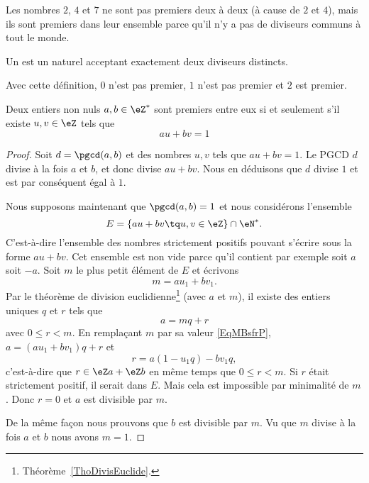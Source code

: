 Les nombres \( 2\), \( 4\) et \( 7\) ne sont pas premiers deux à deux (à cause de \( 2\) et \( 4\)), mais ils sont premiers dans leur ensemble parce qu'il n'y a pas de diviseurs communs à tout le monde.

\begin{definition}
    Un  est un naturel acceptant exactement deux diviseurs distincts.
\end{definition}
Avec cette définition, \( 0\) n'est pas premier, \( 1\) n'est pas premier et \( 2\) est premier.

\begin{theorem} \label{ThoBuNjam}
    Deux entiers non nuls \( a,b\in\eZ^*\) sont premiers entre eux si et seulement s'il existe \( u,v\in\eZ\) tels que
    \begin{equation}
        au+bv=1
    \end{equation}
\end{theorem}

\begin{proof}
    Soit \( d=\pgcd(a,b)\) et des nombres \( u,v\) tels que \( au+bv=1\). Le PGCD \( d\) divise à la fois \( a\) et \( b\), et donc divise \( au+bv\). Nous en déduisons que \( d\) divise \( 1\) et est par conséquent égal à \( 1\).

    Nous supposons maintenant que \( \pgcd(a,b)=1\) et nous considérons l'ensemble
    \begin{equation}
        E=\{ au+bv\tq u,v\in \eZ \}\cap \eN^*.
    \end{equation}
    C'est-à-dire l'ensemble des nombres strictement positifs pouvant s'écrire sous la forme \( au+bv\). Cet ensemble est non vide parce qu'il contient par exemple soit \( a\) soit \( -a\). Soit \( m\) le plus petit élément de \( E\) et écrivons
    \begin{equation}    \label{EqMBsfrP}
        m=au_1+bv_1.
    \end{equation}
    Par le théorème de division euclidienne\footnote{Théorème~\ref{ThoDivisEuclide}.} (avec \( a\) et \( m\)), il existe des entiers uniques $q$ et $r$ tels que
    \begin{equation}
        a=mq+r
    \end{equation}
    avec \( 0\leq r<m\). En remplaçant \( m\) par sa valeur \eqref{EqMBsfrP}, \( a=(au_1+bv_1)q+r\) et
    \begin{equation}
        r=a(1-u_1q)-bv_1q,
    \end{equation}
    c'est-à-dire que \( r\in \eZ a+\eZ b\) en même temps que \( 0\leq r<m\). Si \( r\) était strictement positif, il serait dans \( E\). Mais cela est impossible par minimalité de \( m\). Donc \( r=0\) et \( a\) est divisible par \( m\).

    De la même façon nous prouvons que \( b\) est divisible par \( m\). Vu que \( m\) divise à la fois \( a\) et \( b\) nous avons \( m=1\).
\end{proof}

